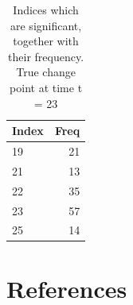 \documentclass[smallextended]{svjour3}       %
\begin{document}
\begin{longtable}[t]{lr}
\caption{\label{tab:chunk_12}Indices which are significant, together with their frequency. True change point at time t = 23}\\
\toprule
Index & Freq\\
\midrule
19 & 21\\
21 & 13\\
22 & 35\\
23 & 57\\
25 & 14\\
\bottomrule
\end{longtable}

\section{References}\label{references}



\end{document}
